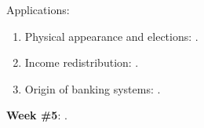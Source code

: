 \documentclass[letterpaper]{article}
\renewenvironment{itemize}{
  \begin{list}{}{
    \setlength{\leftmargin}{1.5em}
  }
}{
  \end{list}
}
\begin{document}
\begin{enumerate}
\begin{itemize}
\begin{enumerate}
          \end{enumerate}

       \item[$\diamond$] Applications:

           \begin{enumerate}


           \item[$\bullet$] Physical appearance and elections: \href{https://doi.org/10.1111/pops.12940}{}.


           \item[$\bullet$] Income redistribution: \href{https://doi.org/10.1111/j.1467-9221.2006.00509.x}{}.


          \item[$\bullet$] Origin of banking systems: \href{https://search.ebscohost.com/login.aspx?direct=true&db=nlebk&AN=516924&site=ehost-live&scope=site&ebv=EB&ppid=pp_88}{}.


         \end{enumerate}

     
      \end{itemize}

 \item {\bf Week \#5}:  {\color{ForestGreen}{\bf Field Experiments}}.



\end{enumerate}
\end{document}

